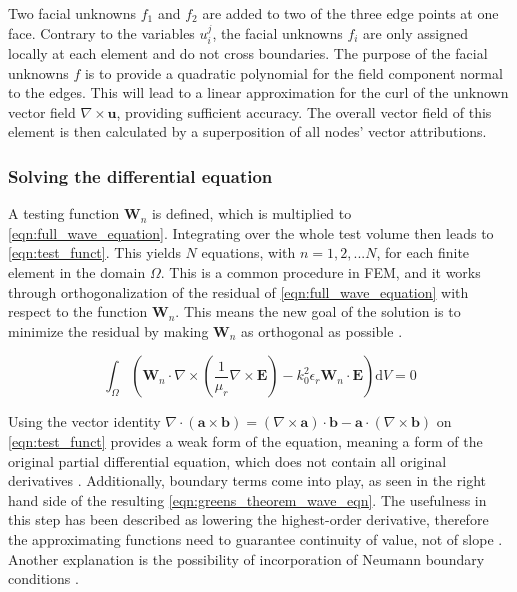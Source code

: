 Two facial unknowns $f_1$ and $f_2$ are added to two of the three edge points at one face. Contrary to the variables $u_i^j$, the facial unknowns $f_i$ are only assigned locally at each element and do not cross boundaries. The purpose of the facial unknowns $f$ is to provide a quadratic polynomial for the field component normal to the edges. This will lead to a linear approximation for the curl of the unknown vector field $\nabla\times \mathbf{u}$, providing sufficient accuracy. The overall vector field of this element is then calculated by a superposition of all nodes' vector attributions.

\subsubsection{Solving the differential equation}

A testing function $\mathbf{W}_n$ is defined, which is multiplied to \autoref{eqn:full_wave_equation}. Integrating over the whole test volume then leads to \autoref{eqn:test_funct}. This yields $N$ equations, with $n=1,2,...N$, for each finite element in the domain $\Omega$. This is a common procedure in FEM, and it works through orthogonalization of the residual of \autoref{eqn:full_wave_equation} with respect to the function $\mathbf{W}_n$. This means the new goal of the solution is to minimize the residual by making $\mathbf{W}_n$ as orthogonal as possible \cite{Mohsen_1982}.

\begin{equation}
    \int_\Omega\left( \mathbf{W}_n\cdot\nabla \times\left( \frac{1}{\mu_r}\nabla\times\mathbf{E} \right)-k_0^2\epsilon_r\mathbf{W}_n\cdot\mathbf{E} \right)\mathrm{d}V=0
    \label{eqn:test_funct}
\end{equation}

Using the vector identity $\nabla\cdot\left(\mathbf{a}\times\mathbf{b}\right)=\left(\nabla\times\mathbf{a}\right)\cdot\mathbf{b}-\mathbf{a}\cdot\left(\nabla\times\mathbf{b}\right)$  on \autoref{eqn:test_funct} provides a weak form of the equation, meaning a form of the original partial differential equation, which does not contain all original derivatives \cite{Cendes_Lee_1988,Cendes_1991}. Additionally, boundary terms come into play, as seen in the right hand side of the resulting \autoref{eqn:greens_theorem_wave_eqn}. The usefulness in this step has been described as lowering the highest-order derivative, therefore the approximating functions need to guarantee continuity of value, not of slope \cite{huebner2001finite}. Another explanation is the possibility of incorporation of Neumann boundary conditions \cite{Mohsen_1982}. 

